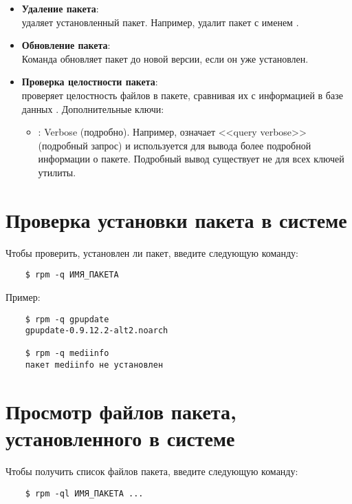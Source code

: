 \begin{itemize}
	\item \textbf{Удаление пакета}: \\
	 удаляет установленный пакет. Например,  удалит пакет с именем .
	
	\item \textbf{Обновление пакета}: \\
	Команда  обновляет пакет до новой версии, если он уже установлен.
	
	\item \textbf{Проверка целостности пакета}: \\
	 проверяет целостность файлов в пакете, сравнивая их с информацией в базе данных .
	Дополнительные ключи:
	\begin{itemize}
		\item \textbf{}: Verbose (подробно). Например,  означает <<query verbose>> (подробный запрос) и используется для вывода более подробной информации о пакете. Подробный вывод существует не для всех ключей утилиты.
	\end{itemize}
	
	
\end{itemize}


\section{Проверка установки пакета в системе}\label{verifying-package}
Чтобы проверить, установлен ли пакет, введите следующую команду: 
\begin{verbatim}
	$ rpm -q ИМЯ_ПАКЕТА 
\end{verbatim}

Пример: 
\begin{verbatim}
	$ rpm -q gpupdate
	gpupdate-0.9.12.2-alt2.noarch
	
	$ rpm -q mediinfo
	пакет mediinfo не установлен
\end{verbatim}

\section{Просмотр файлов пакета, установленного в системе}
Чтобы получить список файлов пакета, введите следующую команду:
\begin{verbatim}
	$ rpm -ql ИМЯ_ПАКЕТА ...
\end{verbatim}

